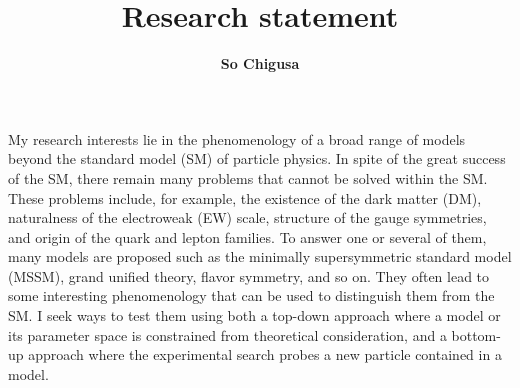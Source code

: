 \documentclass[12pt,notitlepage]{article}
\title{\vspace*{-3cm}Research statement}
\author{\textbf{So Chigusa}}
\date{}
\begin{document}
\maketitle\thispagestyle{empty}

My research interests lie in the phenomenology of a broad range of models beyond the standard model (SM) of particle physics.
In spite of the great success of the SM, there remain many problems that cannot be solved within the SM.
These problems include, for example, the existence of the dark matter (DM), naturalness of the electroweak (EW) scale, structure of the gauge symmetries, and origin of the quark and lepton families.
To answer one or several of them, many models are proposed such as the minimally supersymmetric standard model (MSSM), grand unified theory, flavor symmetry, and so on.
They often lead to some interesting phenomenology that can be used to distinguish them from the SM.
I seek ways to test them using both a top-down approach where a model or its parameter space is constrained from theoretical consideration, and a bottom-up approach where the experimental search probes a new particle contained in a model.


\end{document}
